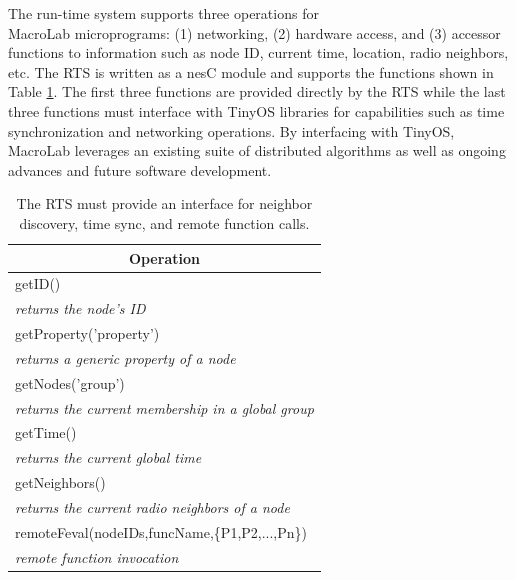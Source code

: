The run-time system supports three operations for \\MacroLab
microprograms: (1) networking, (2) hardware access, and (3) accessor
functions to information such as node ID, current time, location,
radio neighbors, etc.  The RTS is written as a nesC module and supports
the functions shown in Table \ref{table:lib}.  The first three
functions are provided directly by the RTS while the
last three functions must interface with TinyOS libraries for capabilities
such as time synchronization and networking operations.  By interfacing
with TinyOS, MacroLab leverages an existing suite of distributed
algorithms as well as ongoing advances and future software
development.  

\begin{table}
  \centering
   \begin{tabular}{| l |}
     \hline
     \multicolumn{1}{|c|}{Operation} \\
     \hline
     getID() \\
     \textit{returns the node's ID}\\
     \hline
     getProperty('property') \\
     \textit{returns a generic property of a node} \\
     \hline
     getNodes('group') \\
     \textit{returns the current membership in a global group}\\
     \hline
     getTime() \\
     \textit{returns the current global time} \\
     \hline
     getNeighbors() \\
     \textit{returns the current radio neighbors of a node}\\
     \hline
     remoteFeval(nodeIDs,funcName,\{P1,P2,...,Pn\}) \\
     \textit{remote function invocation}\\
     \hline
   \end{tabular}
   \smallskip
   \caption[Functions supported by the Run-Time System]{The RTS must provide an interface for
   neighbor discovery, time sync, and remote function calls.}
   \label{table:lib}
\end{table}

